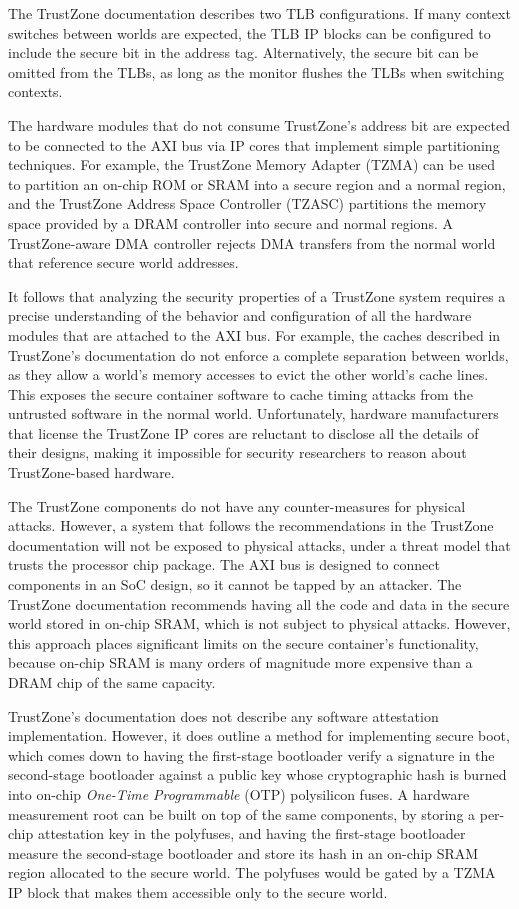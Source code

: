 The TrustZone documentation describes two TLB configurations. If many context
switches between worlds are expected, the TLB IP blocks can be configured to
include the secure bit in the address tag. Alternatively, the secure bit can be
omitted from the TLBs, as long as the monitor flushes the TLBs when switching
contexts.

The hardware modules that do not consume TrustZone's address bit are expected
to be connected to the AXI bus via IP cores that implement simple partitioning
techniques. For example, the TrustZone Memory Adapter (TZMA) can be used to
partition an on-chip ROM or SRAM into a secure region and a normal region, and
the TrustZone Address Space Controller (TZASC) partitions the memory space
provided by a DRAM controller into secure and normal regions. A TrustZone-aware
DMA controller rejects DMA transfers from the normal world that reference
secure world addresses.

It follows that analyzing the security properties of a TrustZone system
requires a precise understanding of the behavior and configuration of all the
hardware modules that are attached to the AXI bus. For example, the caches
described in TrustZone's documentation do not enforce a complete separation
between worlds, as they allow a world's memory accesses to evict the other
world's cache lines. This exposes the secure container software to cache timing
attacks from the untrusted software in the normal world. Unfortunately,
hardware manufacturers that license the TrustZone IP cores are reluctant to
disclose all the details of their designs, making it impossible for security
researchers to reason about TrustZone-based hardware.

The TrustZone components do not have any counter-measures for physical attacks.
However, a system that follows the recommendations in the TrustZone
documentation will not be exposed to physical attacks, under a threat model
that trusts the processor chip package. The AXI bus is designed to connect
components in an SoC design, so it cannot be tapped by an attacker. The
TrustZone documentation recommends having all the code and data in the secure
world stored in on-chip SRAM, which is not subject to physical attacks.
However, this approach places significant limits on the secure container's
functionality, because on-chip SRAM is many orders of magnitude more expensive
than a DRAM chip of the same capacity.

TrustZone's documentation does not describe any software attestation
implementation. However, it does outline a method for implementing secure boot,
which comes down to having the first-stage bootloader verify a signature in the
second-stage bootloader against a public key whose cryptographic hash is burned
into on-chip \textit{One-Time Programmable} (OTP) polysilicon fuses. A hardware
measurement root can be built on top of the same components, by storing a
per-chip attestation key in the polyfuses, and having the first-stage
bootloader measure the second-stage bootloader and store its hash in an on-chip
SRAM region allocated to the secure world. The polyfuses would be gated by a
TZMA IP block that makes them accessible only to the secure world.
